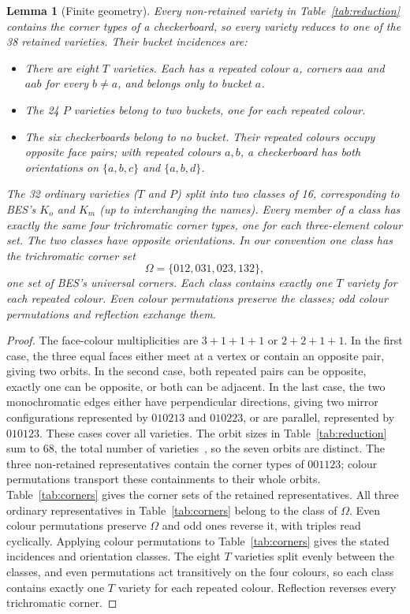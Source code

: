 \documentclass[11pt]{article}
\newtheorem{lemma}{Lemma}
\theoremstyle{remark}
\begin{document}
\begin{lemma}[Finite geometry]\label{lem:geometry}
Every non-retained variety in Table~\ref{tab:reduction} contains the corner
types of a checkerboard, so every variety reduces to one of the 38 retained
varieties. Their bucket incidences are:
\begin{itemize}
\item There are eight $T$ varieties. Each has a repeated colour $a$, corners
  $aaa$ and $aab$ for every $b\ne a$, and belongs only to bucket $a$.
\item The 24 $P$ varieties belong to two buckets, one for each repeated
  colour.
\item The six checkerboards belong to no bucket. Their repeated colours
  occupy opposite face pairs; with repeated colours $a,b$, a checkerboard
  has both orientations on $\{a,b,c\}$ and $\{a,b,d\}$.
\end{itemize}
The 32 ordinary varieties ($T$ and $P$) split into two classes of 16,
corresponding to BES's $K_o$ and $K_m$ (up to interchanging the names).
Every member of a class has exactly the same four trichromatic corner
types, one for each three-element colour set. The two classes have opposite
orientations. In our convention one class has the trichromatic corner set
\[
\Omega=\{012,031,023,132\},
\]
one set of BES's \emph{universal corners}.
Each class contains exactly one $T$ variety for each repeated colour.
Even colour permutations preserve the classes; odd colour permutations and
reflection exchange them.
\end{lemma}
\begin{proof}
The face-colour multiplicities are $3+1+1+1$ or $2+2+1+1$.
In the first case, the three equal faces either meet at a vertex or contain
an opposite pair, giving two orbits. In the second case, both repeated
pairs can be opposite, exactly one can be opposite, or both can be adjacent.
In the last case, the two monochromatic edges either have perpendicular
directions, giving two mirror configurations represented by $010213$ and
$010223$, or are parallel, represented by $010123$. These cases cover all
varieties. The orbit sizes in Table~\ref{tab:reduction} sum to 68, the total
number of varieties~\cite{BES}, so the seven orbits are distinct.
The three non-retained representatives contain the corner types of $001123$;
colour permutations transport these containments to their whole orbits.
Table~\ref{tab:corners} gives the corner sets of the retained representatives.
All three ordinary representatives in Table~\ref{tab:corners} belong
to the class of $\Omega$. Even colour permutations preserve $\Omega$
and odd ones reverse it, with triples read cyclically. Applying colour
permutations to Table~\ref{tab:corners} gives the stated incidences and
orientation classes. The eight $T$ varieties split evenly between the
classes, and even permutations act transitively on the four colours, so
each class contains exactly one $T$ variety for each repeated colour.
Reflection reverses every trichromatic corner.
\end{proof}
\end{document}
